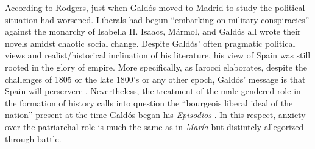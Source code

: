 \documentclass[12pt]{report}
\begin{document}
According to Rodgers, just when Galdós moved to Madrid to study the political situation had worsened.
Liberals had begun \enquote{embarking on military conspiracies} against the monarchy of Isabella II.
Isaacs, Mármol, and Galdós all wrote their novels amidst chaotic social change.
Despite Galdós' often pragmatic political views and realist/historical inclination of his literature, his view of Spain was still rooted in the glory of empire. 
More specifically, as Iarocci elaborates, despite the challenges of 1805 or the late 1800's or any other epoch, Galdós' message is that Spain will perservere \cite[200]{Iarocci2004}.
Nevertheless, the treatment of the male gendered role in the formation of history calls into question the \enquote{bourgeois liberal ideal of the nation} present at the time Galdós began his \textit{Episodios} \cite[200]{Iarocci2004}.
In this respect, anxiety over the patriarchal role is much the same as in \textit{María} but distintcly allegorized through battle.
\end{document}
